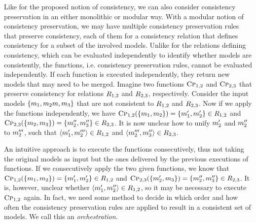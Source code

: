 Like for the proposed notion of consistency, we can also consider consistency preservation in an either monolithic or modular way.
With a modular notion of consistency preservation, we may have multiple \glspl{consistency preservation rule} that preserve consistency, each of them for a \gls{consistency relation} that defines consistency for a subset of the involved models.
Unlike for the relations defining consistency, which can be evaluated independently to identify whether models are consistently, the functions, i.e. \glspl{consistency preservation rule}, cannot be evaluated independently.
If each function is executed independently, they return new models that may need to be merged. 
Imagine two functions $\textsc{Cp}_{1,2}$ and $\textsc{Cp}_{2,3}$ that preserve consistency for relations $R_{1,2}$ and $R_{2,3}$, respectively.
Consider the input models $\{ m_{1}, m_{2}m, m_{3} \}$ that are not consistent to $R_{1,2}$ and $R_{2,3}$.
Now if we apply the functions independently, we have $\textsc{Cp}_{1,2}(\{ m_{1}, m_{2} \}) = \{ m'_{1}, m'_{2} \} \in R_{1,2}$ and 
$\textsc{Cp}_{2,3}(\{ m_{2}, m_{3} \}) = \{ m''_{2}, m''_{3} \} \in R_{2,3}$.
It is now unclear how to unify $m'_{2}$ and $m''_{2}$ to $m'''_{2}$, such that $\langle m'_{1}, m'''_{2} \rangle \in R_{1,2}$ and  $\langle m'''_{2}, m''_{3} \rangle \in R_{2,3}$.

An intuitive approach is to execute the functions consecutively, thus not taking the original models as input but the ones delivered by the previous executions of functions.
If we consecutively apply the two given functions, we know that $\textsc{Cp}_{1,2}(\{ m_{1}, m_{2} \}) = \{ m'_{1}, m'_{2} \} \in R_{1,2}$ and 
$\textsc{Cp}_{2,3}(\{ m'_{2}, m_{3} \}) = \{ m''_{2}, m''_{3} \} \in R_{2,3}$.
It is, however, unclear whether $\langle m'_{1}, m''_{2} \rangle \in R_{1,2}$, so it may be necessary to execute $\textsc{Cp}_{1,2}$ again.
In fact, we need some method to decide in which order and how often the \glspl{consistency preservation rule} are applied to result in a consistent set of models.
We call this an \emph{orchestration}.

